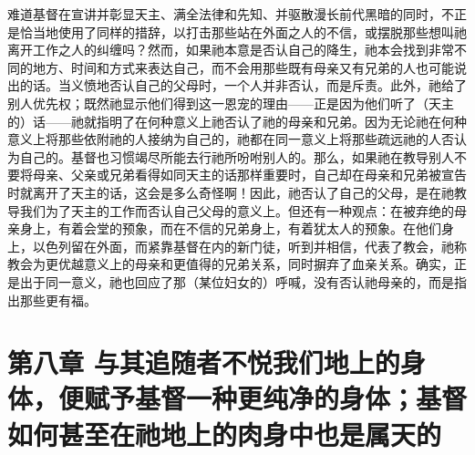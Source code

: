 难道基督在宣讲并彰显天主、满全法律和先知、并驱散漫长前代黑暗的同时，不正是恰当地使用了同样的措辞，以打击那些站在外面之人的不信，或摆脱那些想叫祂离开工作之人的纠缠吗？然而，如果祂本意是否认自己的降生，祂本会找到非常不同的地方、时间和方式来表达自己，而不会用那些既有母亲又有兄弟的人也可能说出的话。当义愤地否认自己的父母时，一个人并非否认，而是斥责。此外，祂给了别人优先权；既然祂显示他们得到这一恩宠的理由——正是因为他们听了（天主的）话——祂就指明了在何种意义上祂否认了祂的母亲和兄弟。因为无论祂在何种意义上将那些依附祂的人接纳为自己的，祂都在同一意义上将那些疏远祂的人否认为自己的。基督也习惯竭尽所能去行祂所吩咐别人的。那么，如果祂在教导别人不要将母亲、父亲或兄弟看得如同天主的话那样重要时，自己却在母亲和兄弟被宣告时就离开了天主的话，这会是多么奇怪啊！因此，祂否认了自己的父母，是在祂教导我们为了天主的工作而否认自己父母的意义上。但还有一种观点：在被弃绝的母亲身上，有着会堂的预象，而在不信的兄弟身上，有着犹太人的预象。在他们身上，以色列留在外面，而紧靠基督在内的新门徒，听到并相信，代表了教会，祂称教会为更优越意义上的母亲和更值得的兄弟关系，同时摒弃了血亲关系。确实，正是出于同一意义，祂也回应了那（某位妇女的）呼喊，没有否认祂母亲的，而是指出那些更有福。\par


\section{第八章 与其追随者不悦我们地上的身体，便赋予基督一种更纯净的身体；基督如何甚至在祂地上的肉身中也是属天的}

